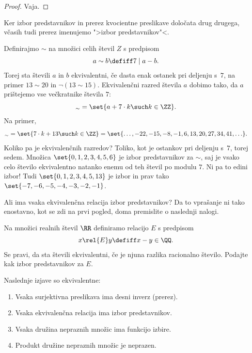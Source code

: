 \begin{proof}
  Vaja.
\end{proof}

Ker izbor predstavnikov in prerez kvocientne preslikave določata drug drugega, včasih tudi
prerez imenujemo ">izbor predstavnikov"<.

\begin{zgled}
  Definirajmo $\sim$ na množici celih števil $Z$ s predpisom
  \begin{equation*}
    a \sim b \defiff 7 \mathrel{|} a - b.
  \end{equation*}
  Torej sta števili $a$ in $b$ ekvivalentni, če dasta enak ostanek pri deljenju s~$7$,
  na primer $13 \sim 20$ in $\lnot (13 \sim 15)$.
  Ekvivalenčni razred števila $a$ dobimo tako, da $a$ prištejemo vse večkratnike števila $7$:
  \begin{equation*}
    [a]_{\sim} = \set{ a + 7 \cdot k \such k \in \ZZ }.
  \end{equation*}
  Na primer,
  \begin{equation*}
    [13]_\sim = \set{ 7 \cdot k + 13 \such k \in \ZZ }
           = \set{ \ldots, -22, -15, -8, -1, 6, 13, 20, 27, 34, 41, \ldots}.
  \end{equation*}
  Koliko pa je ekvivalenčnih razredov? Toliko, kot je ostankov pri deljenju s~$7$, torej sedem. Množica
  $\set{0, 1, 2, 3, 4, 5, 6}$ je izbor predstavnikov za $\sim$, saj je vsako celo število ekvivalentno natanko enemu od
  teh števil po modulu $7$.
  Ni pa to edini izbor! Tudi $\set{0, 1, 2, 3, 4, 5, 13}$ je izbor in prav tako $\set{-7, -6, -5, -4, -3, -2, -1}$.
\end{zgled}

Ali ima vsaka ekvivalenčna relacija izbor predstavnikov? Da to vprašanje ni tako
enostavno, kot se zdi na prvi pogled, doma premislite o naslednji nalogi.

\begin{vaja}
  Na množici realnih števil $\RR$ definiramo relacijo $E$ s predpisom
  \begin{equation*}
    x \rel{E} y  \defiff  x - y \in \QQ.
  \end{equation*}
  Se pravi, da sta števili ekvivalentni, če je njuna razlika racionalno število. Podajte kak
  izbor predstavnikov za $E$.
\end{vaja}

\begin{izrek}
  Naslednje izjave so ekvivalentne:
  \begin{enumerate}
  \item Vsaka surjektivna preslikava ima desni inverz (prerez).
  \item Vsaka ekvivalenčna relacija ima izbor predstavnikov.
  \item Vsaka družina nepraznih množic ima funkcijo izbire.
  \item Produkt družine nepraznih množic je neprazen.
  \end{enumerate}
\end{izrek}

